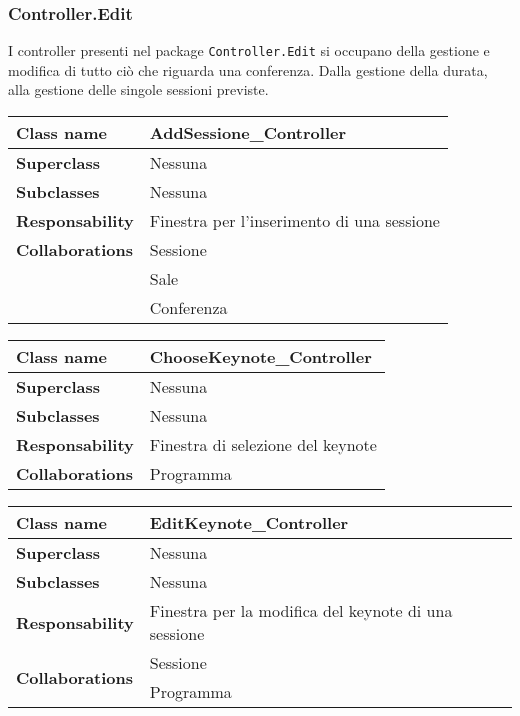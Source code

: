 \subsubsection{Controller.Edit}
I controller presenti nel package \texttt{Controller.Edit} si occupano della gestione e modifica di tutto ciò che riguarda una conferenza. Dalla gestione della durata, alla gestione delle singole sessioni previste.
\begin{table}[h!]
	\begin{tabular}{|l|l|}
		\hline 
		\textbf{Class name} & AddSessione\_Controller
		\\ \hline
		\textbf{Superclass} & Nessuna
		\\ \hline
		\multirow{1}{*}{\textbf{Subclasses}} & Nessuna
		\\ \hline
		\textbf{Responsability} & Finestra per l'inserimento di una sessione
		\\ \hline
		\multirow{1}{*}{\textbf{Collaborations}} & Sessione \\
		& Sale \\
		& Conferenza \\ \hline
	\end{tabular}
\end{table}
\begin{table}[h!]
	\begin{tabular}{|l|l|}
		\hline 
		\textbf{Class name} & ChooseKeynote\_Controller
		\\ \hline
		\textbf{Superclass} & Nessuna
		\\ \hline
		\multirow{1}{*}{\textbf{Subclasses}} & Nessuna
		\\ \hline
		\textbf{Responsability} & Finestra di selezione del keynote
		\\ \hline
		\multirow{1}{*}{\textbf{Collaborations}} & Programma
		\\ \hline
	\end{tabular}
\end{table}
\begin{table}[h!]
	\begin{tabular}{|l|l|}
		\hline 
		\textbf{Class name} & EditKeynote\_Controller
		\\ \hline
		\textbf{Superclass} & Nessuna
		\\ \hline
		\multirow{1}{*}{\textbf{Subclasses}} & Nessuna
		\\ \hline
		\textbf{Responsability} & Finestra per la modifica del keynote di una sessione
		\\ \hline
		\multirow{2}{*}{\textbf{Collaborations}} & Sessione \\
		& Programma \\ \hline
	\end{tabular}
\end{table}
